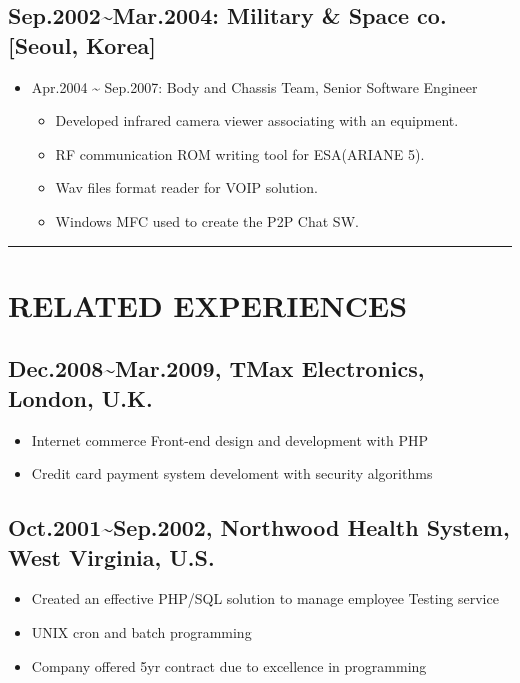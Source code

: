 \documentclass[12pt,a4paper]{article}
\begin{document}
\subsection{Sep.2002{\textasciitilde}Mar.2004: Military \& Space co. [Seoul, Korea]}
\begin{itemize}
\item Apr.2004 {\textasciitilde} Sep.2007: Body and Chassis Team, Senior Software Engineer

\begin{itemize}
\item Developed infrared camera viewer associating with an equipment.


\item RF communication ROM writing tool for ESA(ARIANE 5).


\item Wav files format reader for VOIP solution.


\item Windows MFC used to create the P2P Chat SW. 

\end{itemize}
\end{itemize}
\rule{\textwidth}{1pt}
\section{RELATED EXPERIENCES}
\subsection{Dec.2008{\textasciitilde}Mar.2009, TMax Electronics, London, U.K.}
\begin{itemize}
\item Internet commerce Front-end design and development with PHP


\item Credit card payment system develoment with security algorithms

\end{itemize}
\subsection{Oct.2001{\textasciitilde}Sep.2002, Northwood Health System, West Virginia, U.S.}
\begin{itemize}
\item Created an effective PHP/SQL solution to manage employee Testing service


\item UNIX cron and batch programming


\item Company offered 5yr contract due to excellence in programming

\end{itemize}
\end{document}
